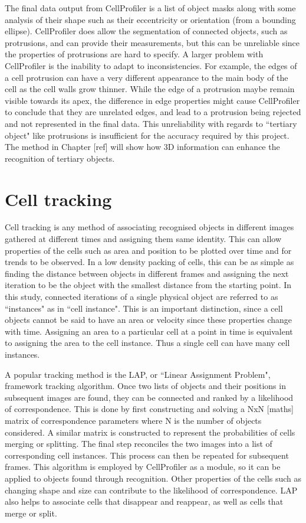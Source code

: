 The final data output from CellProfiler is a list of object masks along with some analysis of their shape such as their eccentricity or orientation (from a bounding ellipse). CellProfiler does allow the segmentation of connected objects, such as protrusions, and can provide their measurements, but this can be unreliable since the properties of protrusions are hard to specify. A larger problem with CellProfiler is the inability to adapt to inconsistencies. For example, the edges of a cell protrusion can have a very different appearance to the main body of the cell as the cell walls grow thinner. While the edge of a protrusion maybe remain visible towards its apex, the difference in edge properties might cause CellProfiler to conclude that they are unrelated edges, and lead to a protrusion being rejected and not represented in the final data. This unreliability with regards to ``tertiary object" like protrusions is insufficient for the accuracy required by this project. The method in Chapter [ref] will show how 3D information can enhance the recognition of tertiary objects.

\section{Cell tracking}

Cell tracking is any method of associating recognised objects in different images gathered at different times and assigning them same identity. This can allow properties of the cells such as area and position to be plotted over time and for trends to be observed. In a low density packing of cells, this can be as simple as finding the distance between objects in different frames and assigning the next iteration to be the object with the smallest distance from the starting point. In this study, connected iterations of a single physical object are referred to as ``instances" as in ``cell instance". This is an important distinction, since a cell objects cannot be said to have an area or velocity since these properties change with time. Assigning an area to a particular cell at a point in time is equivalent to assigning the area to the cell instance. Thus a single cell can have many cell instances.

A popular tracking method is the LAP, or ``Linear Assignment Problem", framework tracking algorithm. Once two lists of objects and their positions in subsequent images are found, they can be connected and ranked by a likelihood of correspondence. This is done by first constructing and solving a NxN [maths] matrix of correspondence parameters where N is the number of objects considered. A similar matrix is constructed to represent the probabilities of cells merging or splitting. The final step reconciles the two images into a list of corresponding cell instances. This process can then be repeated for subsequent frames. This algorithm is employed by CellProfiler as a module, so it can be applied to objects found through recognition. Other properties of the cells such as changing shape and size can contribute to the likelihood of correspondence. LAP also helps to associate cells that disappear and reappear, as well as cells that merge or split.

